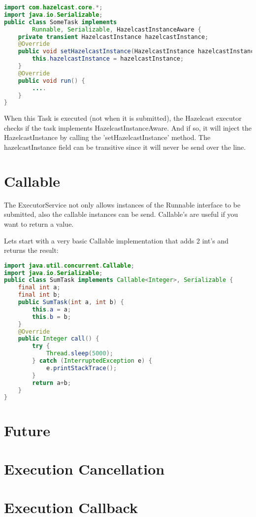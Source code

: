 \begin{lstlisting}[language=java]
import com.hazelcast.core.*;
import java.io.Serializable;
public class SomeTask implements
        Runnable, Serializable, HazelcastInstanceAware {
    private transient HazelcastInstance hazelcastInstance;
    @Override
    public void setHazelcastInstance(HazelcastInstance hazelcastInstance) {
        this.hazelcastInstance = hazelcastInstance;
    }
    @Override
    public void run() {
        ....
    }
}
\end{lstlisting}
When this Task is executed (not when it is submitted), the Hazelcast executor checks if the task implements HazelcastInstanceAware. And if so, it will inject the HazelcastInstance by calling the 'setHazelcastInstance' method. The hazelcastInstance field can be transitive since it will never be send over the line. 

\section{Callable}
The ExecutorService not only allows instances of the Runnable interface to be submitted, also the callable instances can be send. Callable's are useful if you want to return a value.

Lets start with a very basic Callable implementation that adds 2 int's and returns the result:
\begin{lstlisting}[language=java]
import java.util.concurrent.Callable;
import java.io.Serializable;
public class SumTask implements Callable<Integer>, Serializable {
    final int a;
    final int b;
    public SumTask(int a, int b) {
        this.a = a;
        this.b = b;
    }
    @Override
    public Integer call() {
        try {
            Thread.sleep(5000); 
        } catch (InterruptedException e) {
            e.printStackTrace();
        }	    
        return a+b;
    }
}

\end{lstlisting}

\section{Future}

\section{Execution Cancellation}

\section{Execution Callback}

